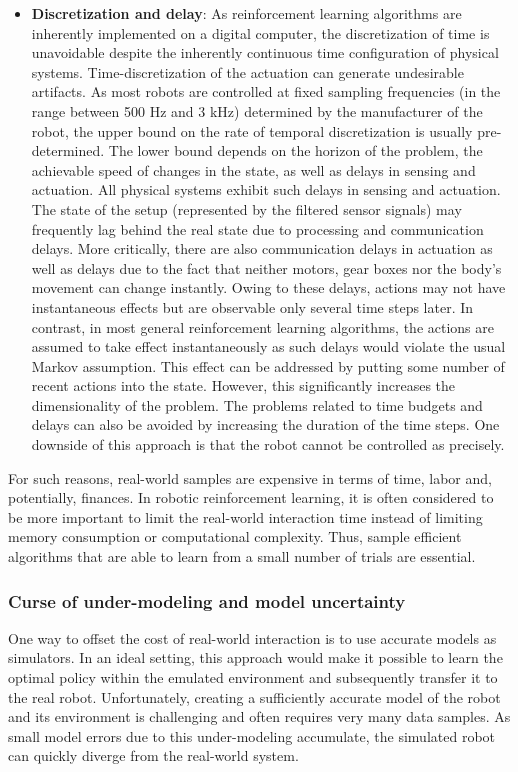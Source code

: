 \begin{itemize}
\item \textbf{Discretization and delay}:
As reinforcement learning algorithms are inherently implemented on a digital computer, the discretization of
time is unavoidable despite the inherently continuous time configuration of physical systems. Time-discretization of the
actuation can generate undesirable artifacts. As most robots are controlled at fixed sampling frequencies (in the range between
500 Hz and 3 kHz) determined by the manufacturer of the robot, the upper bound on the rate of temporal discretization
is usually pre-determined. The lower bound depends on the horizon of the problem, the achievable speed of changes in
the state, as well as delays in sensing and actuation. All physical systems exhibit such delays in sensing and
actuation. The state of the setup (represented by the filtered sensor signals) may frequently lag behind the real state due
to processing and communication delays. More critically, there are also communication delays in actuation as well
as delays due to the fact that neither motors, gear boxes nor the body's movement can change instantly. Owing to
these delays, actions may not have instantaneous effects but are observable only several time steps later. In contrast, 
in most general reinforcement learning algorithms, the actions are assumed to take effect instantaneously as such
delays would violate the usual Markov assumption. This effect can be addressed by putting some number of recent
actions into the state. However, this significantly increases the dimensionality of the problem.
The problems related to time budgets and delays can also be avoided by increasing the duration of the time steps.
One downside of this approach is that the robot cannot be controlled as precisely.%
\end{itemize}

For such reasons, real-world samples are expensive in terms of time, labor and, potentially, finances. In robotic reinforcement learning,
it is often considered to be more important to limit the real-world interaction time instead of limiting memory consumption or computational complexity.
Thus, sample efficient algorithms that are able to learn from a small number of trials are essential.

\subsubsection{Curse of under-modeling and model uncertainty}
One way to offset the cost of real-world interaction is to use accurate models as simulators. In an ideal setting, this
approach would make it possible to learn the optimal policy within the emulated environment and subsequently transfer it to the real robot.
Unfortunately, creating a sufficiently accurate model of the robot and its environment is challenging and often requires
very many data samples. As small model errors due to this under-modeling accumulate, the simulated robot can
quickly diverge from the real-world system.

